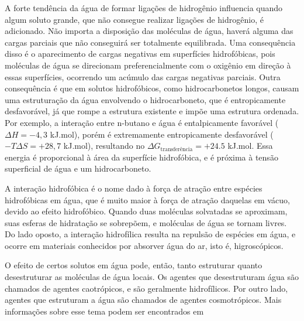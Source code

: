 	A forte tendência da água de formar ligações de hidrogênio influencia quando algum soluto grande, que não consegue realizar ligações de hidrogênio, é adicionado. Não importa a disposição das moléculas de água, haverá alguma das cargas parciais que não conseguirá ser totalmente equilibrada. Uma consequência disso é o aparecimento de cargas negativas em superfícies hidrofóbicas, pois moléculas de água se direcionam preferencialmente com o oxigênio em direção à essas superfícies, ocorrendo um acúmulo das cargas negativas parciais. Outra consequência é que em solutos hidrofóbicos, como hidrocarbonetos longos, causam uma estruturação da água envolvendo o hidrocarboneto, que é entropicamente desfavorável, já que rompe a estrutura existente e impõe uma estrutura ordenada. Por exemplo, a interação entre n-butano e água é entalpicamente favorável (\(\Delta H = -4,3\) kJ.mol\menosUm), porém é extremamente entropicamente desfavorável (\(-T\Delta S = +28,7\) kJ.mol\menosUm), resultando no \(\Delta G_{\mathrm{transferência}} = +24.5\) kJ.mol\menosUm. Essa energia é proporcional à área da superfície hidrofóbica, e é próxima à tensão superficial de água e um hidrocarboneto. 
	
	A interação hidrofóbica é o nome dado à força de atração entre espécies hidrofóbicas em água, que é muito maior à força de atração daquelas em vácuo, devido ao efeito hidrofóbico. Quando duas moléculas solvatadas se aproximam, suas esferas de hidratação se sobrepõem, e moléculas de água se tornam livres. Do lado oposto, a interação hidrofílica resulta na repulsão de espécies em água, e ocorre em materiais conhecidos por absorver água do ar, isto é, higroscópicos.
	
	O efeito de certos solutos em água pode, então, tanto estruturar quanto desestruturar as moléculas de água locais. Os agentes que desestruturam água são chamados de agentes caotrópicos, e são geralmente hidrofílicos. Por outro lado, agentes que estruturam a água são chamados de agentes cosmotrópicos. Mais informações sobre esse tema podem ser encontrados em \citeauthor{Marcus2009a} %
	   
	
	
